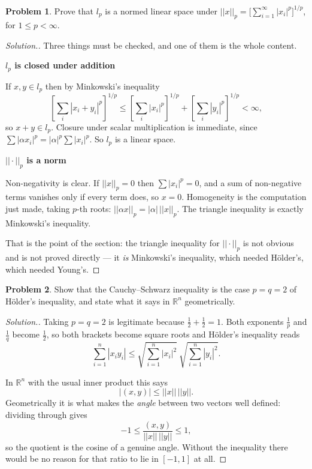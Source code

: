 \documentclass[11pt,a4paper]{article}
\theoremstyle{definition}
\newtheorem{problemx}{Problem}[section]
\newenvironment{problem}{\begin{problemx}}{\end{problemx}}
\newenvironment{solution}
  {\renewcommand{\qedsymbol}{}\begin{proof}[\textit{Solution}.]}
  {\end{proof}}
\newcommand{\subhead}[1]{%
  \par\medskip\noindent\textbf{#1}\par\nobreak\smallskip}
\begin{document}
\begin{problem}
Prove that $l_p$ is a normed linear space under
$\displaystyle{||x||_p=\Big[\sum_{i=1}^{\infty}|x_i|^p\Big]^{1/p}}$, for
$1\leq p<\infty$.
\end{problem}
\begin{solution}
Three things must be checked, and one of them is the whole content.

\subhead{$l_p$ is closed under addition}
If $x,y\in l_p$ then by Minkowski's inequality
$$\left[\sum_i |x_i+y_i|^p\right]^{1/p}\leq
\left[\sum_i |x_i|^p\right]^{1/p}+\left[\sum_i |y_i|^p\right]^{1/p}<\infty ,$$
so $x+y\in l_p$. Closure under scalar multiplication is immediate, since
$\sum|\alpha x_i|^p=|\alpha|^p\sum|x_i|^p$. So $l_p$ is a linear space.

\subhead{$||\cdot||_p$ is a norm}
Non-negativity is clear. If $||x||_p=0$ then $\sum|x_i|^p=0$, and a sum of
non-negative terms vanishes only if every term does, so $x=0$. Homogeneity is
the computation just made, taking $p$-th roots:
$||\alpha x||_p=|\alpha|\,||x||_p$. The triangle inequality is exactly
Minkowski's inequality.

That is the point of the section: the triangle inequality for $||\cdot||_p$ is
not obvious and is not proved directly --- it \emph{is} Minkowski's inequality,
which needed H\"older's, which needed Young's.
\end{solution}

\begin{problem}
Show that the Cauchy--Schwarz inequality is the case $p=q=2$ of H\"older's
inequality, and state what it says in $\mathbb{R}^n$ geometrically.
\end{problem}
\begin{solution}
Taking $p=q=2$ is legitimate because $\frac12+\frac12=1$. Both exponents
$\frac1p$ and $\frac1q$ become $\frac12$, so both brackets become square roots
and H\"older's inequality reads
$$\sum_{i=1}^{n}|x_iy_i|\leq\sqrt{\sum_{i=1}^{n}|x_i|^2}\ \sqrt{\sum_{i=1}^{n}|y_i|^2}.$$

In $\mathbb{R}^n$ with the usual inner product this says
$$|(x,y)|\leq ||x||\,||y|| .$$
Geometrically it is what makes the \emph{angle} between two vectors well
defined: dividing through gives
$$-1\leq\frac{(x,y)}{||x||\,||y||}\leq 1 ,$$
so the quotient is the cosine of a genuine angle. Without the inequality there
would be no reason for that ratio to lie in $[-1,1]$ at all.
\end{solution}
\end{document}

